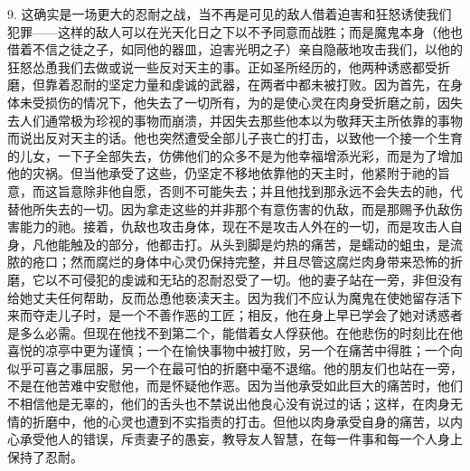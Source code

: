 9. 这确实是一场更大的忍耐之战，当不再是可见的敌人借着迫害和狂怒诱使我们犯罪——这样的敌人可以在光天化日之下以不予同意而战胜；而是魔鬼本身（他也借着不信之徒之子，如同他的器皿，迫害光明之子）亲自隐蔽地攻击我们，以他的狂怒怂恿我们去做或说一些反对天主的事。正如圣所经历的，他两种诱惑都受折磨，但靠着忍耐的坚定力量和虔诚的武器，在两者中都未被打败。因为首先，在身体未受损伤的情况下，他失去了一切所有，为的是使心灵在肉身受折磨之前，因失去人们通常极为珍视的事物而崩溃，并因失去那些他本以为敬拜天主所依靠的事物而说出反对天主的话。他也突然遭受全部儿子丧亡的打击，以致他一个接一个生育的儿女，一下子全部失去，仿佛他们的众多不是为他幸福增添光彩，而是为了增加他的灾祸。但当他承受了这些，仍坚定不移地依靠他的天主时，他紧附于祂的旨意，而这旨意除非他自愿，否则不可能失去；并且他找到那永远不会失去的祂，代替他所失去的一切。因为拿走这些的并非那个有意伤害的仇敌，而是那赐予仇敌伤害能力的祂。接着，仇敌也攻击身体，现在不是攻击人外在的一切，而是攻击人自身，凡他能触及的部分，他都击打。从头到脚是灼热的痛苦，是蠕动的蛆虫，是流脓的疮口；然而腐烂的身体中心灵仍保持完整，并且尽管这腐烂肉身带来恐怖的折磨，它以不可侵犯的虔诚和无玷的忍耐忍受了一切。他的妻子站在一旁，非但没有给她丈夫任何帮助，反而怂恿他亵渎天主。因为我们不应认为魔鬼在使她留存活下来而夺走儿子时，是一个不善作恶的工匠；相反，他在身上早已学会了她对诱惑者是多么必需。但现在他找不到第二个，能借着女人俘获他。在他悲伤的时刻比在他喜悦的凉亭中更为谨慎；一个在愉快事物中被打败，另一个在痛苦中得胜；一个向似乎可喜之事屈服，另一个在最可怕的折磨中毫不退缩。他的朋友们也站在一旁，不是在他苦难中安慰他，而是怀疑他作恶。因为当他承受如此巨大的痛苦时，他们不相信他是无辜的，他们的舌头也不禁说出他良心没有说过的话；这样，在肉身无情的折磨中，他的心灵也遭到不实指责的打击。但他以肉身承受自身的痛苦，以内心承受他人的错误，斥责妻子的愚妄，教导友人智慧，在每一件事和每一个人身上保持了忍耐。\par

